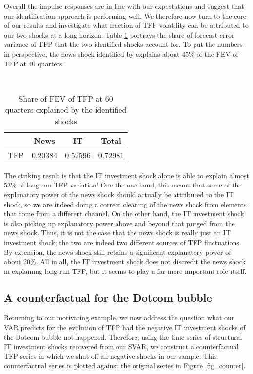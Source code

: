 \documentclass[11pt]{article}
\renewcommand{\[}{\begin{equation}}
\renewcommand{\]}{\end{equation}}
\begin{document}
Overall the impulse responses are in line with our expectations and suggest that our identification approach is performing well. We therefore now turn to the core of our results and investigate what fraction of TFP volatility can be attributed to our two shocks at a long horizon. Table \ref{tab_vardecomp} portrays the share of forecast error variance of TFP that the two identified shocks account for. To put the numbers in perspective, the news shock identified by \cite{barsky_sims2011} explains about 45\% of the FEV of TFP at 40 quarters.   


\begin{table}[h!]
\centering
\caption{Share of FEV of TFP at 60 quarters explained by the identified shocks}
\label{tab_vardecomp}
\

\begin{large}
	\begin{tabular}{lccc}
	\hline
		& News & IT & Total \\
		\hline
	TFP	           & 0.20384  & 0.52596 & 0.72981  \\
		\hline
	\end{tabular}
\end{large}
\end{table}

The striking result is that the IT investment shock alone is able to explain almost 53\% of long-run TFP variation!  One the one hand, this means that some of the explanatory power of the news shock should actually be attributed to the IT shock, so we are indeed doing a correct cleaning of the news shock from elements that come from a different channel. On the other hand, the IT investment shock is also picking up explanatory power above and beyond that purged from the news shock. Thus, it is not the case that the news shock is really just an IT investment shock; the two are indeed two different sources of TFP fluctuations. By extension, the news shock still retains a significant explanatory power of about 20\%. All in all, the IT investment shock does not discredit the news shock in explaining long-run TFP, but it seems to play a far more important role itself.

\subsection{A counterfactual for the Dotcom bubble}
Returning to our motivating example, we now address the question what our VAR predicts for the evolution of TFP had the negative IT investment shocks of the Dotcom bubble not happened. Therefore, using the time series of structural IT investment shocks recovered from our SVAR, we construct a counterfactual TFP series in which we shut off all negative shocks in our sample. This counterfactual series is plotted against the original series in Figure \ref{fig_counter}.
\end{document}
